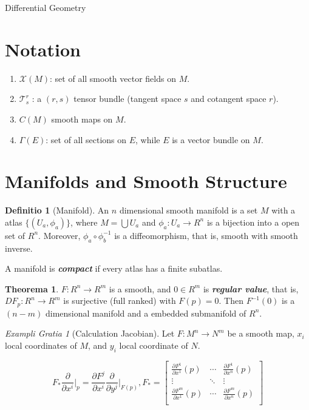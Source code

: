 \documentclass[12pt, a4paper]{article}
\theoremstyle{definition}
\newtheorem{theorem}{Theorema}[section]
\newtheorem{definition}{Definitio}[section]
\theoremstyle{remark}
\newtheorem{example}{Exampli Gratia}[section]
\renewcommand{\emph}[1]{\textbf{\textit{#1}}}
\begin{document}
{\huge{Differential Geometry}}

\section{Notation}
\begin{multicols}{2}
	\begin{enumerate}
		\item $\mathscr{X}(M)$: set of all smooth vector fields on $M$.
		\item $\mathscr{T}^r_s$ : a $(r,s)$ tensor bundle (tangent space $s$ and cotangent space $r$).
		\item $C(M)$ smooth maps on $M$.
		\item $\Gamma(E)$: set of all sections on $E$, while $E$ is a vector bundle on $M$.
	\end{enumerate}
\end{multicols}
	

\section{Manifolds and Smooth Structure}

\begin{definition}[Manifold]
	An $n$ dimensional smooth manifold is a set $M$ with a atlas $\{(U_a, \phi_a)\}$, where $M = \bigcup U_a$ and $\phi_a: U_a \rightarrow R^n$ is a bijection into a open set of $R^n$. Moreover, $\phi_a \circ \phi_b^{-1}$ is a diffeomorphism, that is, smooth with smooth inverse.

	A manifold is \emph{compact} if every atlas has a finite subatlas.
\end{definition}

\begin{theorem}
	$F: R^n \rightarrow  R^m$ is a smooth, and $0 \in R^m$ is \emph{regular value}, that is, $DF_p: R^n \rightarrow R^m$ is surjective (full ranked) with $F(p) = 0$. Then $F^{-1}(0)$ is a $(n-m)$ dimensional manifold and a embedded submanifold of $R^n$.
\end{theorem}

\begin{example} [Calculation Jacobian] \label{eg:Jacobian_Matrix}
	Let $F: M^n \rightarrow N^m$ be a smooth map, $x_i$ local coordinates of $M$, and $y_i$ local coordinate of $N$.

	\[ 
		F_* \frac{\partial }{\partial x^i}\bigg\rvert_p 
		= \frac{\partial F^j}{\partial x^i} \frac{\partial }{\partial y^j}\bigg\rvert_{F(p)}
		,
		F_* = 
		\begin{bmatrix}
			\frac{\partial F^1}{\partial x^1}(p) & \cdots & \frac{\partial F^1}{\partial x^n}(p) \\
			\vdots & \ddots & \vdots \\ 
			\frac{\partial F^m}{\partial x^1}(p) & \cdots & \frac{\partial F^m}{\partial x^n}(p) \\
		\end{bmatrix}
	\]
\end{example}
\end{document}
